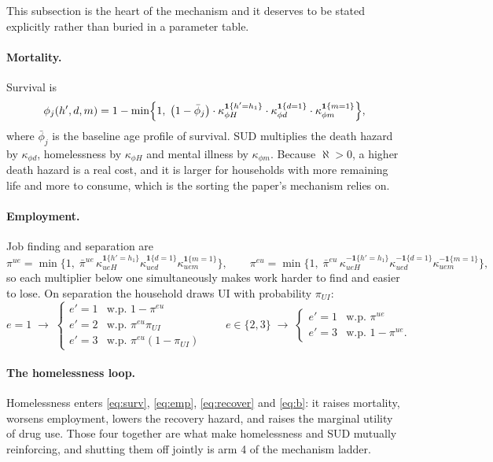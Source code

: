 \documentclass[11pt]{article}
\newcommand{\ind}[1]{\mathbf{1}\{#1\}}
\begin{document}
This subsection is the heart of the mechanism and it deserves to be stated
explicitly rather than buried in a parameter table.

\paragraph{Mortality.} Survival is
\begin{equation}
\phi_j(h',d,m)=1-\min\Bigl\{1,\;\bigl(1-\bar\phi_j\bigr)\cdot
\kappa_{\phi H}^{\ind{h'=h_1}}\cdot\kappa_{\phi d}^{\ind{d=1}}\cdot\kappa_{\phi m}^{\ind{m=1}}\Bigr\},
\label{eq:surv}
\end{equation}
where $\bar\phi_j$ is the baseline age profile of survival. SUD multiplies the
death hazard by $\kappa_{\phi d}$, homelessness by $\kappa_{\phi H}$ and mental
illness by $\kappa_{\phi m}$. Because $\aleph>0$, a higher death hazard is a real
cost, and it is larger for households with more remaining life and more to
consume, which is the sorting the paper's mechanism relies on.

\paragraph{Employment.} Job finding and separation are
\begin{equation}
\pi^{ue}=\min\bigl\{1,\;\bar\pi^{ue}\,\kappa_{ueH}^{\ind{h'=h_1}}\kappa_{ued}^{\ind{d=1}}\kappa_{uem}^{\ind{m=1}}\bigr\},
\qquad
\pi^{eu}=\min\bigl\{1,\;\bar\pi^{eu}\,\kappa_{ueH}^{-\ind{h'=h_1}}\kappa_{ued}^{-\ind{d=1}}\kappa_{uem}^{-\ind{m=1}}\bigr\},
\label{eq:emp}
\end{equation}
so each multiplier below one simultaneously makes work harder to find and easier
to lose. On separation the household draws UI with probability $\pi_{UI}$:
\[
e=1\;\longrightarrow\;
\begin{cases}
e'=1 & \text{w.p. } 1-\pi^{eu}\\
e'=2 & \text{w.p. } \pi^{eu}\pi_{UI}\\
e'=3 & \text{w.p. } \pi^{eu}(1-\pi_{UI})
\end{cases}
\qquad
e\in\{2,3\}\;\longrightarrow\;
\begin{cases}
e'=1 & \text{w.p. } \pi^{ue}\\
e'=3 & \text{w.p. } 1-\pi^{ue} .
\end{cases}
\]

\paragraph{The homelessness loop.} Homelessness enters \eqref{eq:surv},
\eqref{eq:emp}, \eqref{eq:recover} and \eqref{eq:b}: it raises mortality, worsens
employment, lowers the recovery hazard, and raises the marginal utility of drug
use. Those four together are what make homelessness and SUD mutually reinforcing,
and shutting them off jointly is arm 4 of the mechanism ladder.
\end{document}
